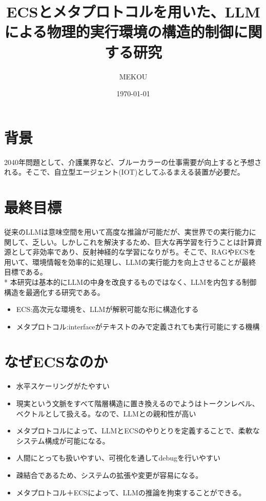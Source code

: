 \documentclass{article}
\date{\today}
\title{ECSとメタプロトコルを用いた、LLMによる物理的実行環境の構造的制御に関する研究}
\author{MEKOU}
\begin{document}
    \maketitle

    \section{背景}
        2040年問題として、介護業界など、ブルーカラーの仕事需要が向上すると予想される。そこで、自立型エージェント(IOT)としてふるまえる装置が必要だ。
    
    \section{最終目標}
        従来のLLMは意味空間を用いて高度な推論が可能だが、実世界での実行能力に関して、乏しい。しかしこれを解決するため、巨大な再学習を行うことは計算資源として非効率であり、反射神経的な学習になりがち。そこで、RAGやECSを用いて、環境情報を効率的に処理し、LLMの実行能力を向上させることが最終目標である。\\
        * 本研究は基本的にLLMの中身を改良するものではなく、LLMを内包する制御構造を最適化する研究である。\\
        \begin{itemize}
            \item ECS:高次元な環境を、LLMが解釈可能な形に構造化する \\
            \item メタプロトコル:interfaceがテキストのみで定義されても実行可能にする機構
        \end{itemize}
        
    \section{なぜECSなのか}
    \begin{itemize}
        \item 水平スケーリングがたやすい
        \item 現実という文脈をすべて階層構造に置き換えるのでようはトークンレベル、ベクトルとして扱える。なので、LLMとの親和性が高い
        \item メタプロトコルによって、LLMとECSのやりとりを定義することで、柔軟なシステム構成が可能になる。
        \item 人間にとっても扱いやすい、可視化を通してdebugを行いやすい
        \item 疎結合であるため、システムの拡張や変更が容易になる。
        \item メタプロトコル＋ECSによって、LLMの推論を拘束することができる。
    \end{itemize}
\end{document}

